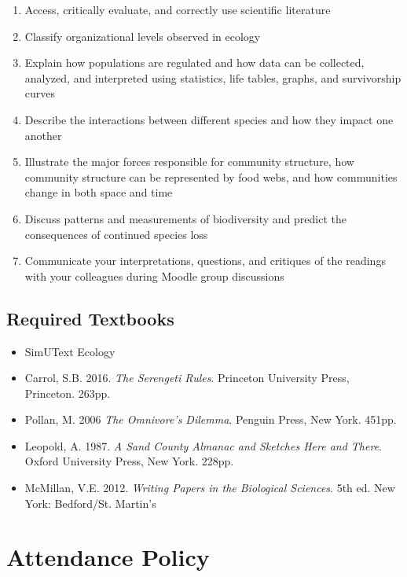 \documentclass{tufte-handout}
\begin{document}
\begin{fullwidth}
\begin{enumerate}
	\item Access, critically evaluate, and correctly use scientific literature
	\item Classify organizational levels observed in ecology
	\item Explain how populations are regulated and how data can be collected, analyzed, and interpreted using statistics, life tables, graphs, and survivorship curves
	\item Describe the interactions between different species and how they impact one another
	\item Illustrate the major forces responsible for community structure, how community structure can be represented by food webs, and how communities change in both space and time
	\item Discuss patterns and measurements of biodiversity and predict the consequences of continued species loss
	\item Communicate your interpretations, questions, and critiques of the readings with your colleagues during Moodle group discussions
\end{enumerate}

\subsection{Required Textbooks}

\begin{itemize}
	\item SimUText Ecology
	\item Carrol, S.B. 2016. \emph{The Serengeti Rules}. Princeton University Press, Princeton. 263pp.
	\item Pollan, M. 2006 \emph{The Omnivore's Dilemma}. Penguin Press, New York. 451pp.
	\item Leopold, A. 1987. \emph{A Sand County Almanac and Sketches Here and There}. Oxford University Press, New York. 228pp.
	\item McMillan, V.E. 2012. \emph{Writing Papers in the Biological Sciences}. 5th ed. New York: Bedford/St. Martin's
\end{itemize}

\section{Attendance Policy}


\end{fullwidth}
\end{document}
